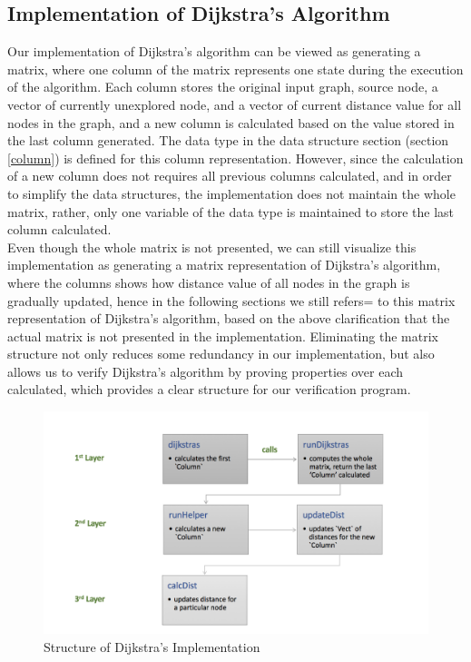 \subsection{Implementation of Dijkstra's Algorithm} \label{implementation}
Our implementation of Dijkstra's algorithm can be viewed as generating a matrix, where one column of the matrix represents one state during the execution of the algorithm. Each column stores the original input graph, source node, a vector of currently unexplored node, and a vector of current distance value for all nodes in the graph, and a new column is calculated based on the value stored in the last column generated. The  data type in the data structure section (section \ref{column}) is defined for this column representation. However, since the calculation of a new column does not requires all previous columns calculated, and in order to simplify the data structures, the implementation does not maintain the whole matrix, rather, only one variable of the  data type is maintained to store the last column calculated. 
\\

Even though the whole matrix is not presented, we can still visualize this implementation as generating a matrix representation of Dijkstra's algorithm, where the columns shows how distance value of all nodes in the graph is gradually updated, hence in the following sections we still refers= to this matrix representation of Dijkstra's algorithm, based on the above clarification that the actual matrix is not presented in the implementation. Eliminating the matrix structure not only reduces some redundancy in our implementation, but also allows us to verify Dijkstra's algorithm by proving properties over each  calculated, which provides a clear structure for our verification program.

\begin{figure}[H]
	\centering
	\includegraphics[scale = 0.6]{./figure/dijkstras_funcs.png}
	\caption{Structure of Dijkstra's Implementation}
	\label{figure3}
\end{figure}

